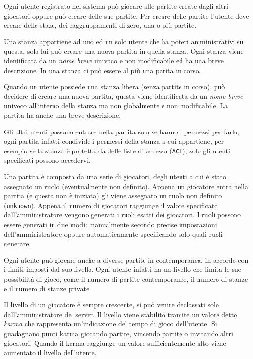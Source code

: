 Ogni utente registrato nel sistema può giocare alle partite create dagli altri giocatori oppure può creare delle sue partite. Per creare delle partite l'utente deve creare delle staze, dei raggruppamenti di zero, una o più partite.

Una stanza appartiene ad uno ed un solo utente che ha poteri amministrativi su questa, solo lui può creare una nuova partita in quella stanza. Ogni stanza viene identificata da un \emph{nome breve} univoco e non modificabile ed ha una breve descrizione. In una stanza ci può essere al più una parita in corso.

Quando un utente possiede una stanza libera (senza partite in corso), può decidere di creare una nuova partita, questa viene identificata da un \emph{nome breve} univoco all'interno della stanza ma non globalmente e non modificabile. La partita ha anche una breve descrizione.

Gli altri utenti possono entrare nella partita solo se hanno i permessi per farlo, ogni partita infatti condivide i permessi della stanza a cui appartiene, per esempio se la stanza è protetta da delle liste di accesso (\texttt{ACL}), solo gli utenti specificati possono accedervi.

Una partita è composta da una serie di giocatori, degli utenti a cui è stato assegnato un ruolo (eventualmente non definito). Appena un giocatore entra nella partita (e questa non è iniziata) gli viene assegnato un ruolo non definito (\texttt{unknown}). Appena il numero di giocatori raggiunge il valore specificato dall'amministratore vengono generati i ruoli esatti dei giocatori. I ruoli possono essere generati in due modi: manualmente secondo precise impostazioni dell'amministratore oppure automaticamente specificando solo quali ruoli generare.

Ogni utente può giocare anche a diverse partite in contemporanea, in accordo con i limiti imposti dal suo livello. Ogni utente infatti ha un livello che limita le sue possibilità di gioco, come il numero di partite contemporanee, il numero di stanze e il numero di stanze private.

Il livello di un giocatore è sempre crescente, si può venire declassati solo dall'amministratore del server. Il livello viene stabilito tramite un valore detto \emph{karma} che rappresenta un'indicazione del tempo di gioco dell'utente. Si guadagnano punti karma giocando partite, vincendo partite o invitando altri giocatori. Quando il karma raggiunge un valore sufficientemente alto viene aumentato il livello dell'utente. 

